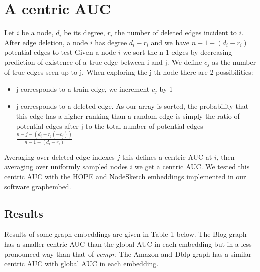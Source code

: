 \documentclass{article}
\begin{document}
\section{A centric AUC}

Let $i$ be a node, $d_{i}$ be its degree, $r_{i}$ the number of deleted edges incident to $i$.
After edge deletion, a node $i$ has degree $d_{i} - r_{i}$ and we have  $ n - 1 - (d_{i} - r_{i})$  potential edges to test
Given a node $i$ we sort the n-1 edges by decreasing prediction of existence of a true edge between i and j. We define $c_{j}$  as the number of true edges seen up to j.
When exploring the j-th node there are 2 possibilities:
\begin{itemize}
    \item j corresponds to a train edge, we increment $c_{j}$ by 1
    \item j corresponds to a deleted edge. As our array is sorted, the probability that this edge has a higher
          ranking than a random edge is simply the ratio of potential edges after j to
          the total number of potential edges $ \frac{n-j-(d_{i}-r_{i}(-c_{j}))}{n-1-(d_{i}-r_{i})}$
\end{itemize}
Averaging over deleted edge indexes $j$ this defines a centric AUC at  $i$, then averaging over uniformly sampled nodes $i$ we get a centric AUC.
We tested this centric AUC with the HOPE \citep{Ou2016asymmetric} and NodeSketch \citep{Yang2019nodesketch} embeddings implemented
in our software \href{https://github.com/jean-pierreBoth/graphembed}{\color{blue}graphembed}.

\subsection{Results}

Results of some graph embeddings are given in Table 1 below. The Blog graph has a smaller centric AUC than the global AUC in each embedding but in a less pronounced way than that of \textit{vcmpr}. The Amazon and Dblp graph has a similar centric AUC with global AUC in each embedding.
\end{document}
